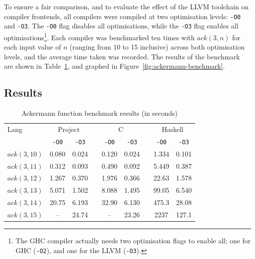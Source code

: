 To ensure a fair comparison, and to evaluate the effect of the LLVM toolchain on compiler frontends,
all compilers were compiled at two optimisation levels: \texttt{-O0} and \texttt{-O3}. The
\texttt{-O0} flag disables all optimisations, while the \texttt{-O3} flag enables all
optimisations\footnote{The GHC compiler actually needs two optimisation flags to enable all; one for
GHC (\texttt{-O2}), and one for the LLVM (\texttt{-O3}).}. Each compiler was benchmarked ten times
with $ack(3,n)$ for each input value of $n$ (ranging from 10 to 15 inclusive) across both
optimisation levels, and the average time taken was recorded. The results of the benchmark are shown
in Table~\ref{tab:ackermann-benchmark}, and graphed in Figure~\ref{fig:ackermann-benchmark}.

\subsection{Results}

\begin{table}\centering
    \renewcommand{\arraystretch}{1.3}
    \label{tab:ackermann-benchmark}
    \caption{Ackermann function benchmark results (in seconds)}

    \begin{tabular}{@{}lcccccccc@{}} \toprule
        Lang        & \multicolumn{2}{c}{Project} &              & \multicolumn{2}{c}{C} &              & \multicolumn{2}{c}{Haskell}                                  \\
        \cmidrule{2-3} \cmidrule{5-6} \cmidrule{8-9}
                    & \texttt{-O0}                & \texttt{-O3} &                       & \texttt{-O0} & \texttt{-O3}                &  & \texttt{-O0} & \texttt{-O3} \\ \midrule
        $ack(3,10)$ & 0.080                       & 0.024        &                       & 0.120        & 0.024                       &  & 1.334        & 0.101        \\
        $ack(3,11)$ & 0.312                       & 0.093        &                       & 0.490        & 0.092                       &  & 5.449        & 0.387        \\
        $ack(3,12)$ & 1.267                       & 0.370        &                       & 1.976        & 0.366                       &  & 22.63        & 1.578        \\
        $ack(3,13)$ & 5.071                       & 1.502        &                       & 8.088        & 1.495                       &  & 99.05        & 6.540        \\
        $ack(3,14)$ & 20.75                       & 6.193        &                       & 32.90        & 6.130                       &  & 475.3        & 28.08        \\
        $ack(3,15)$ & --                          & 24.74        &                       & --           & 23.26                       &  & 2237         & 127.1        \\
        \bottomrule
    \end{tabular}
\end{table}

